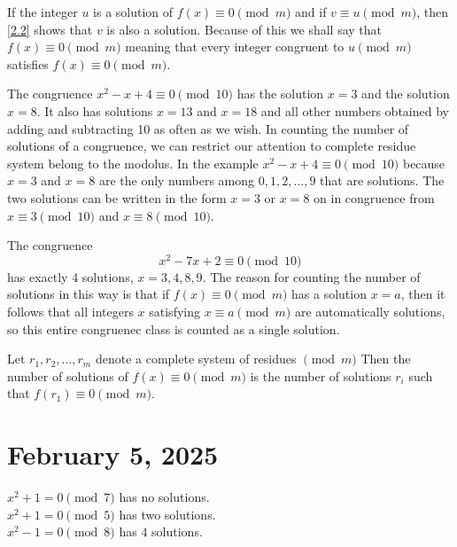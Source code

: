 \documentclass[11pt]{article}
\begin{document}
If the integer \(u\) is a solution of \(f(x) \equiv 0 \pmod{m}\) and if \(v
\equiv u \pmod{m}\), then \cref{2.2} shows that \(v\) is also a solution.
Because of this we shall say that \(f(x) \equiv 0 \pmod{m}\) meaning that every
integer congruent to \(u \pmod{m}\) satisfies \(f(x) \equiv 0 \pmod{m}\).
\begin{example}
	The congruence \(x^2 - x + 4 \equiv 0 \pmod{10}\) has the solution \(x = 3\) and the solution \(x = 8\). It also has solutions \(x = 13\) and \(x = 18\) and all other numbers obtained by adding and subtracting 10 as often as we wish. In counting the number of solutions of a congruence, we can restrict our attention to complete residue system belong to the modolus. In the example \(x^2 - x + 4 \equiv 0 \pmod{10}\) because \(x = 3\) and \(x = 8\) are the only numbers among \(0, 1, 2, \ldots, 9\) that are solutions. The two solutions can be written in the form \(x = 3\) or \(x = 8\) on in congruence from \(x \equiv 3 \pmod{10}\) and \(x \equiv 8 \pmod{10}\).
\end{example}

\begin{example}
	The congruence
	\[x^2 - 7x + 2 \equiv 0 \pmod{10}\]
	has exactly 4 solutions, \(x = 3, 4, 8, 9\). The reason for counting the number
	of solutions in this way is that if \(f(x) \equiv 0 \pmod{m}\) has a solution
	\(x = a\), then it follows that all integers \(x\) satisfying \(x \equiv a
	\pmod{m}\) are automatically solutions, so this entire congruenec class is
	counted as a single solution.
\end{example}

\begin{definition}
	Let \(r_1, r_2, \ldots, r_m\) denote a complete system of residues \(\pmod{m}\) Then the number of solutions of \(f(x) \equiv 0 \pmod{m}\) is the number of solutions \(r_i\) such that \(f(r_1) \equiv 0 \pmod{m}\).
\end{definition}

\section{February 5, 2025}
\begin{example}

	\(x^2 + 1 = 0 \pmod{7}\) has no solutions. \\
	\(x^2 + 1 = 0 \pmod{5}\) has two solutions. \\
	\(x^2 - 1 = 0 \pmod{8}\) has \(4\) solutions.

\end{example}
\end{document}
